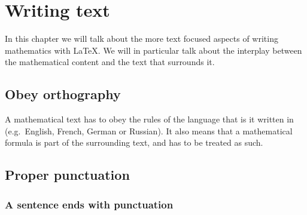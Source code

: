 


\chapter{Writing text}

In this chapter we will talk about the more text focused aspects of writing mathematics with {\LaTeX}.
We will in particular talk about the interplay between the mathematical content and the text that surrounds it.




\section{Obey orthography}
\label{a mathematical text is a text}

A mathematical text has to obey the rules of the language that is it written in (e.g.~English, French, German or Russian).
It also means that a mathematical formula is part of the surrounding text, and has to be treated as such.





\section{Proper punctuation}



\subsection{A sentence ends with punctuation}


